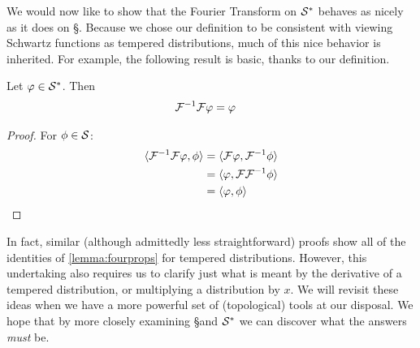       We would now like to show that the Fourier Transform on $\S^*$ behaves as nicely as it does on \S.
      Because we chose our definition to be consistent with viewing Schwartz functions as tempered distributions, much of this nice behavior is inherited.
      For example, the following result is basic, thanks to our definition.
      \begin{thm}
        \label{thm:fourinv_td}
        Let $\varphi\in\S^*$.
        Then
        \begin{align*}
          \F^{-1}\F\varphi &= \varphi
        \end{align*}
      \end{thm}
      \begin{proof}
        For $\phi\in\S$:
        \begin{align*}
          \langle\F^{-1}\F\varphi, \phi\rangle &= \langle \F\varphi, \F^{-1}\phi\rangle\\
          &= \langle\varphi, \F\F^{-1}\phi\rangle\\
          &= \langle\varphi, \phi\rangle
        \end{align*}
      \end{proof}

      In fact, similar (although admittedly less straightforward) proofs show all of the identities of \cref{lemma:fourprops} for tempered distributions.
      However, this undertaking also requires us to clarify just what is meant by the derivative of a tempered distribution, or multiplying a distribution by $x$.
      We will revisit these ideas when we have a more powerful set of (topological) tools at our disposal.
      We hope that by more closely examining \S and $\S^*$ we can discover what the answers \emph{must} be.

